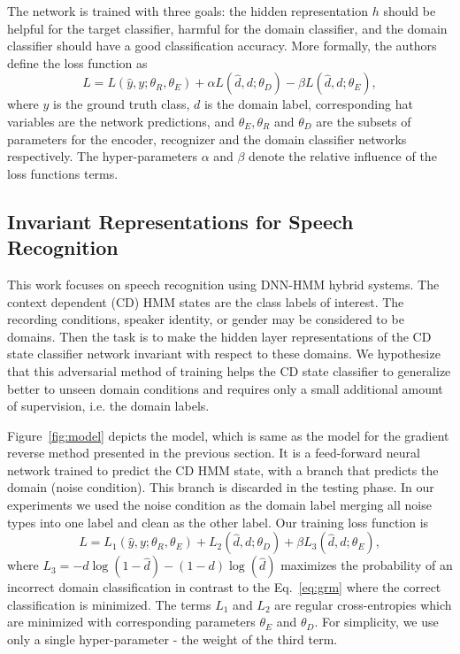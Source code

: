 \documentclass{article}
\begin{document}
    The network is trained with three goals: the hidden representation $h$ should
    be helpful for the target classifier, harmful for the domain classifier,
    and the domain classifier should have a good classification accuracy. More 
    formally, the authors define the loss function as
    \begin{equation}
        L = L(\hat{y}, y; \theta_R, \theta_E) + 
        \alpha L(\hat{d}, d; \theta_D) -
        \beta L(\hat{d}, d; \theta_E),
        \label{eq:grm}
    \end{equation}
    where $y$ is the ground truth class, $d$ is the domain label, corresponding
    hat variables are the network predictions, and $\theta_E, \theta_R$ and $\theta_D$ are the subsets of  parameters for the encoder,
    recognizer and the domain classifier networks respectively. The hyper-parameters
    $\alpha$ and $\beta$ denote the relative influence of the loss functions terms.

\subsection{Invariant Representations for Speech Recognition}
\label{sec:invariant-speech}

This work focuses on speech recognition using DNN-HMM hybrid systems. The context dependent (CD) HMM states are the class labels of interest. The
recording conditions, speaker identity, or gender may be considered to be domains. Then the task is to make the hidden layer representations of the CD state classifier network 
invariant with respect to these domains. We hypothesize that this adversarial method of
training helps the CD state classifier to generalize better to unseen domain conditions and requires only a  
small additional amount of supervision, i.e. the domain labels.  

Figure~\ref{fig:model} depicts the model, which is same as the model for the gradient reverse method presented in the previous section. It is a feed-forward neural network trained to predict the CD HMM state, with a branch that predicts the domain (noise condition). This branch is discarded in the testing phase. In our experiments we
used the noise condition as the domain label merging all noise types into one label
and clean as the other label. Our training loss function is
    \begin{equation}
        L = L_1(\hat{y}, y; \theta_R, \theta_E) + 
        L_2(\hat{d}, d; \theta_D) +
        \beta L_3(\hat{d}, d; \theta_E),
        \label{eq:cost}
    \end{equation}
where $L_3 = - d\log(1 - \hat{d}) - (1-d)\log(\hat{d})$ maximizes the probability
of an incorrect domain classification in contrast to the Eq.~\ref{eq:grm} where the 
correct classification is minimized.
The terms $L_1$ and $L_2$ are 
regular cross-entropies which are minimized with corresponding parameters $\theta_E$ and $\theta_D$.
For simplicity, we use only a single hyper-parameter - the weight of the third term.
\end{document}
